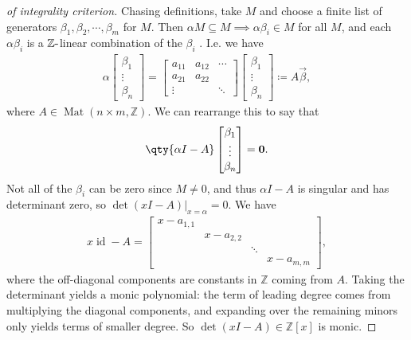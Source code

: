 \begin{proof}[of integrality criterion]

Chasing definitions, take \(M\) and choose a finite list of generators
\(\beta_1, \beta_2, \cdots, \beta_m\) for \(M\). Then
\(\alpha M \subseteq M \implies \alpha \beta_i \in M\) for all \(M\),
and each \(\alpha \beta_i\) is a \({\mathbb{Z}}{\hbox{-}}\)linear
combination of the \(\beta_i\) . I.e. we have
\begin{align*}
\alpha 
\begin{bmatrix}
\beta_1 
\\
\vdots  
\\
\beta_n  
\end{bmatrix}
= 
\begin{bmatrix}
a_{11} & a_{12} & \cdots
\\
a_{21} &  a_{22} & 
\\
 \vdots &  &\ddots  
\end{bmatrix}
\begin{bmatrix}
\beta_1 
\\
\vdots  
\\
\beta_n  
\end{bmatrix}
\coloneqq A \vec{\beta}
,\end{align*}
where \(A \in \operatorname{Mat}(n\times m, {\mathbb{Z}})\). We can
rearrange this to say that
\begin{align*}
\qty{ \alpha I - A} 
\begin{bmatrix}
\beta_1 
\\
\vdots  
\\
\beta_n  
\end{bmatrix}
=
\mathbf{0}
.\end{align*}
Not all of the \(\beta_i\) can be zero since \(M\neq 0\), and thus
\(\alpha I - A\) is singular and has determinant zero, so
\(\det(x I - A)\Big|_{x=\alpha} = 0\). We have
\begin{align*}
x\operatorname{id}- A = 
\begin{bmatrix}
x - a_{1,1} &  & &
\\
&  x - a_{2, 2} & & 
\\
&  & \ddots &
\\
& &  & x - a_{m, m}
\end{bmatrix}
,\end{align*}
where the off-diagonal components are constants in \({\mathbb{Z}}\)
coming from \(A\). Taking the determinant yields a monic polynomial: the
term of leading degree comes from multiplying the diagonal components,
and expanding over the remaining minors only yields terms of smaller
degree. So \(\det (x I - A) \in {\mathbb{Z}}[x]\) is monic.

\end{proof}

